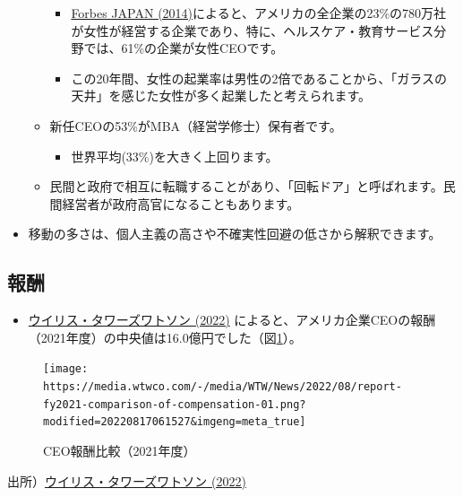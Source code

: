 \documentclass[
]{book}
\providecommand{\tightlist}{%
  \setlength{\itemsep}{0pt}\setlength{\parskip}{0pt}}
\begin{document}
\begin{itemize}
\begin{itemize}
    \begin{itemize}
    \item
      \href{https://forbesjapan.com/articles/detail/990}{Forbes JAPAN (2014)}によると、アメリカの全企業の23\%の780万社が女性が経営する企業であり、特に、ヘルスケア・教育サービス分野では、61\%の企業が女性CEOです。
    \item
      この20年間、女性の起業率は男性の2倍であることから、「ガラスの天井」を感じた女性が多く起業したと考えられます。
    \end{itemize}
  \item
    新任CEOの53\%がMBA（経営学修士）保有者です。

    \begin{itemize}
    \tightlist
    \item
      世界平均(33\%)を大きく上回ります。
    \end{itemize}
  \item
    民間と政府で相互に転職することがあり、「回転ドア」と呼ばれます。民間経営者が政府高官になることもあります。
  \end{itemize}
\item
  移動の多さは、個人主義の高さや不確実性回避の低さから解釈できます。
\end{itemize}

\hypertarget{us-payment}{%
\subsection{報酬}\label{us-payment}}

\begin{itemize}
\tightlist
\item
  \href{https://www.wtwco.com/ja-JP/News/2022/08/report-fy2021-comparison-of-compensation-for-ceos-and-ned-between-japan-the-united-states-and-europe}{ウイリス・タワーズワトソン (2022)} によると、アメリカ企業CEOの報酬（2021年度）の中央値は16.0億円でした（図\ref{fig:g5ceopay}）。
\end{itemize}

\begin{figure}
\texttt{[image: https://media.wtwco.com/-/media/WTW/News/2022/08/report-fy2021-comparison-of-compensation-01.png?modified=20220817061527\&imgeng=meta\_true]} \caption{CEO報酬比較（2021年度）}\label{fig:g5ceopay}
\end{figure}

出所）\href{https://www.wtwco.com/ja-JP/News/2022/08/report-fy2021-comparison-of-compensation-for-ceos-and-ned-between-japan-the-united-states-and-europe}{ウイリス・タワーズワトソン (2022)}
\end{document}
